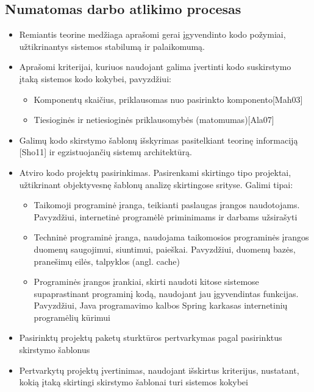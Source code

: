 \subsection{Numatomas darbo atlikimo procesas}
\begin{itemize}
    \item Remiantis teorine medžiaga aprašomi gerai įgyvendinto kodo požymiai, užtikrinantys
sistemos stabilumą ir palaikomumą.
    \item Aprašomi kriterijai, kuriuos naudojant galima įvertinti kodo suskirstymo įtaką sistemos
kodo kokybei, pavyzdžiui:
    \begin{itemize}
        \item Komponentų skaičius, priklausomas nuo pasirinkto komponento[Mah03]
        \item Tiesioginės ir netiesioginės priklausomybės (matomumas)[Ala07]
    \end{itemize}
    \item Galimų kodo skirstymo šablonų išskyrimas pasitelkiant teorinę informaciją [Sho11] ir
egzistuojančių sistemų architektūrą.
    \item Atviro kodo projektų pasirinkimas. Pasirenkami skirtingo tipo projektai, užtikrinant
objektyvesnę šablonų analizę skirtingose srityse. Galimi tipai:
    \begin{itemize}
        \item Taikomoji programinė įranga, teikianti paslaugas įrangos naudotojams. Pavyzdžiui,
internetinė programėlė priminimams ir darbams užsirašyti
        \item Techninė programinė įranga, naudojama taikomosios programinės įrangos duomenų
saugojimui, siuntimui, paieškai. Pavyzdžiui, duomenų bazės, pranešimų eilės, talpyklos
(angl. cache)
        \item Programinės įrangos įrankiai, skirti naudoti kitose sistemose supaprastinant programinį
kodą, naudojant jau įgyvendintas funkcijas. Pavyzdžiui, Java programavimo kalbos
Spring karkasas internetinių programėlių kūrimui
    \end{itemize}
    \item Pasirinktų projektų paketų sturktūros pertvarkymas pagal pasirinktus skirstymo šablonus
    \item Pertvarkytų projektų įvertinimas, naudojant išskirtus kriterijus, nustatant, kokią įtaką
skirtingi skirstymo šablonai turi sistemos kokybei
\end{itemize}


